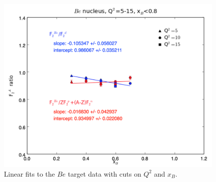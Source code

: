 \documentclass[oneside]{article}
\begin{document}
\begin{figure}[H]
\begin{minipage}{0.5\textwidth}
\includegraphics[width=\textwidth]{plots/q2_all_x_all/all_Be.png}
\end{minipage}
  \caption[]{Linear fits to the $Be$ target data with cuts on $Q^2$ and $x_B$.}
  \label{fig:fits_Be}
\end{figure}   
\end{document}
